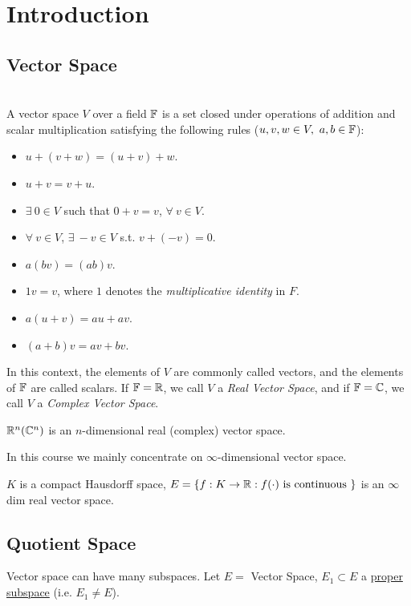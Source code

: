 \section{Introduction}
\subsection{Vector Space}
\begin{definition}\ \\
A vector space $V$ over a field $\mathbb{F}$ is a set closed under operations of addition and scalar multiplication satisfying the following rules ($u,v,w \in V,\ a,b \in \mathbb{F}$):
\begin{itemize}
    \item $u + (v+w) = (u+v)+w$.
    \item $u + v = v + u$.
    \item $\exists\ 0 \in V$ such that $ 0 + v = v$, $\forall\ v \in V$.
    \item $\forall\ v \in V$, $\exists\ -v \in V$ s.t. $v + (-v) = 0$.
    \item $a(bv) = (ab)v$.
    \item $1 v = v$, where $1$ denotes the \textit{multiplicative identity} in $F$.
    \item $a(u+v) = au + av$.
    \item $(a+b)v = av + bv$.
\end{itemize}
In this context, the elements of $V$ are commonly called vectors, and the elements of $\mathbb{F}$ are called scalars. If $\mathbb{F} = \mathbb{R}$, we call $V$ a \textit{Real Vector Space}, and if $\mathbb{F} = \mathbb{C}$, we call $V$ a \textit{Complex Vector Space}.
\end{definition}
\begin{example}
$\mathbb{R}^n (\mathbb{C}^n)$ is an $n$-dimensional real (complex) vector space.
\end{example}

\np In this course we mainly concentrate on $\infty$-dimensional vector space.

\begin{example}
$K$ is a compact Hausdorff space, $E = \{f: K \to \mathbb{R}: f(\cdot) \text{ is continuous }\}$ is an $\infty$ dim real vector space.
\end{example}

\subsection{Quotient Space}
\noindent Vector space can have many subspaces. Let $E = $ Vector Space, $E_1 \subset E$ a \underline{proper subspace} (i.e. $E_1 \neq E$).

